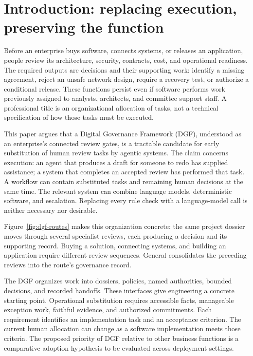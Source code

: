 \section{Introduction: replacing execution, preserving the function}

Before an enterprise buys software, connects systems, or releases an application, people review
its architecture, security, contracts, cost, and operational readiness. The required outputs are
decisions and their supporting work: identify a missing agreement, reject an unsafe network
design, require a recovery test, or authorize a conditional release. These functions persist
even if software performs work previously assigned to analysts, architects, and committee
support staff. A professional title is an organizational allocation of tasks, not a technical
specification of how those tasks must be executed.

This paper argues that a Digital Governance Framework (DGF), understood as an enterprise's
connected review gates, is a tractable candidate for early substitution of human review tasks
by agentic systems. The claim concerns execution: an agent that produces a draft for someone
to redo has supplied assistance; a system that completes an accepted review has performed that
task. A workflow can contain substituted tasks and remaining human decisions at the same time.
The relevant system can combine language models, deterministic software, and escalation.
Replacing every rule check with a language-model call is neither necessary nor desirable.

Figure~\ref{fig:dgf-routes} makes this organization concrete: the same project dossier moves
through several specialist reviews, each producing a decision and its supporting record.
Buying a solution, connecting systems, and building an application require different review
sequences. General consolidates the preceding reviews into the route's governance record.



The DGF organizes work into dossiers, policies, named authorities, bounded decisions, and
recorded handoffs. These interfaces give engineering a concrete starting point. Operational
substitution requires accessible facts, manageable exception work, faithful evidence, and
authorized commitments. Each requirement identifies an implementation task and an acceptance
criterion. The current human allocation can change as a software implementation meets those
criteria. The proposed priority of DGF relative to other business functions is a comparative
adoption hypothesis to be evaluated across deployment settings.

